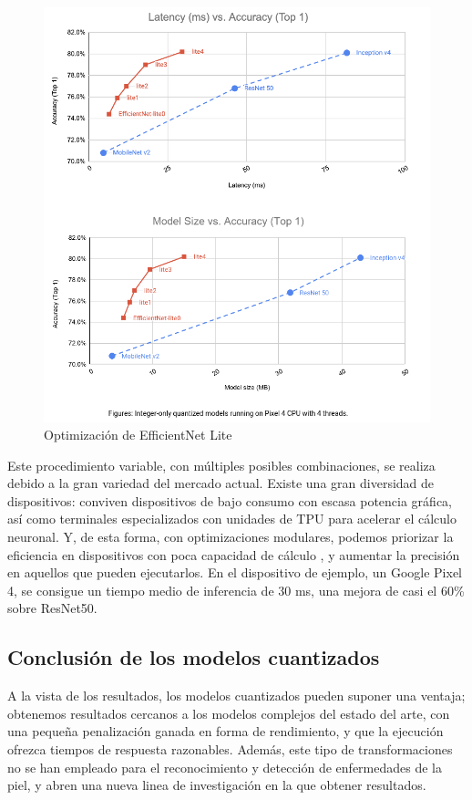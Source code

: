 \begin{figure}[H]

	\centering
	\includegraphics[scale = 0.325]{imagenes/eflite.png}
	\caption{Optimización de EfficientNet Lite}
		\label{eflite}
\end{figure}

Este procedimiento variable, con múltiples posibles combinaciones, se realiza debido a la gran variedad del mercado actual. Existe una gran diversidad de  dispositivos: conviven dispositivos de bajo consumo con escasa potencia gráfica, así como terminales especializados con unidades de TPU para acelerar el cálculo neuronal. Y, de esta forma, con optimizaciones modulares, podemos priorizar la eficiencia en dispositivos con poca capacidad de cálculo , y aumentar la precisión en aquellos que pueden ejecutarlos. En el dispositivo de ejemplo, un Google Pixel 4, se consigue un tiempo medio de inferencia de 30 ms, una mejora de casi el 60\% sobre ResNet50.

\subsection{Conclusión de los modelos cuantizados}

A la vista de los resultados, los modelos cuantizados pueden suponer una ventaja; obtenemos resultados cercanos a los modelos complejos del estado del arte, con una pequeña penalización ganada en forma de rendimiento, y que la ejecución ofrezca tiempos de respuesta razonables. Además, este tipo de transformaciones no se han empleado para el reconocimiento y detección de enfermedades de la piel, y abren una nueva linea de investigación en la que obtener resultados.

